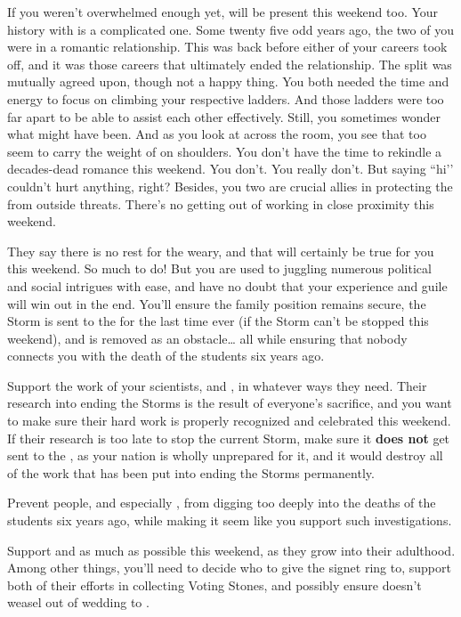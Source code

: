\documentclass[char]{GL2020}
\begin{document}
If you weren’t overwhelmed enough yet, \cAntiChup{\intro} will be present this weekend too. Your history with \cAntiChup{} is a complicated one. Some twenty five odd years ago, the two of you were in a romantic relationship. This was back before either of your careers took off, and it was those careers that ultimately ended the relationship. The split was mutually agreed upon, though not a happy thing. You both needed the time and energy to focus on climbing your respective ladders. And those ladders were too far apart to be able to assist each other effectively. Still, you sometimes wonder what might have been. And as you look at \cAntiChup{\them} across the room, you see that \cAntiChup{\they} too seem\cAntiChup{\verbs} to carry the weight of \pEarth{} on \cAntiChup{\their} shoulders. You don’t have the time to rekindle a decades-dead romance this weekend. You don’t. You really don’t. But saying ``hi’’ couldn’t hurt anything, right? Besides, you two are crucial allies in protecting the \pTech{} from outside threats. There’s no getting out of working in close proximity this weekend.

They say there is no rest for the weary, and that will certainly be true for you this weekend. So much to do! But you are used to juggling numerous political and social intrigues with ease, and have no doubt that your experience and guile will win out in the end. You'll ensure the \cHeir{\formal} family position remains secure, the Storm is sent to the \pShip{} for the last time ever (if the Storm can’t be stopped this weekend), and \cLoud{} is removed as an obstacle\ldots{} all while ensuring that nobody connects you with the death of the students six years ago.

\begin{itemz}
    \item Support the work of your scientists, \cHeadScientist{} and \cAssistantScientist{}, in whatever ways they need. Their research into ending the Storms is the result of everyone's sacrifice, and you want to make sure their hard work is properly recognized and celebrated this weekend. If their research is too late to stop the current Storm, make sure it \textbf{does not} get sent to the \pTech{}, as your nation is wholly unprepared for it, and it would destroy all of the work that has been put into ending the Storms permanently.
    \item Prevent people, and especially \cHeir{}, from digging too deeply into the deaths of the students six years ago, while making it seem like you support such investigations.
    \item Support \cHeir{} and \cAmbition{} as much as possible this weekend, as they grow into their adulthood. Among other things, you’ll need to decide who to give the signet ring to, support both of their efforts in collecting Voting Stones, and possibly ensure \cHeir{} doesn’t weasel out of \cHeir{\their} wedding to \cChupStudent{}.
\end{itemz}
\end{document}
